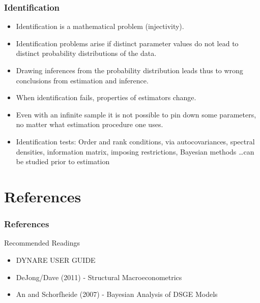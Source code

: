 \documentclass[handout]{beamer}  %
\begin{document}
\begin{frame}\frametitle{Identification}
	\begin{itemize}
		\item Identification is a mathematical problem (injectivity).
		\item Identification problems arise if distinct parameter values do not lead to distinct probability distributions of the data.
		\item Drawing inferences from the probability distribution leads thus to wrong conclusions from estimation and inference.
		\item When identification fails, properties of estimators change.
		\item Even with an infinite sample it is not possible to pin down some parameters, no matter what estimation procedure one uses.
		\item Identification tests: Order and rank conditions, via autocovariances, spectral densities, information matrix, imposing restrictions, Bayesian methods \dots can be studied prior to estimation
	\end{itemize}
\end{frame}

\section{References}
\begin{frame}\frametitle{References}
Recommended Readings
  \begin{itemize}
    \item DYNARE USER GUIDE
    \item DeJong/Dave (2011) - Structural Macroeconometrics
    \item An and Schorfheide (2007) - Bayesian Analysis of DSGE Models
  \end{itemize}
\end{frame}
\end{document}
